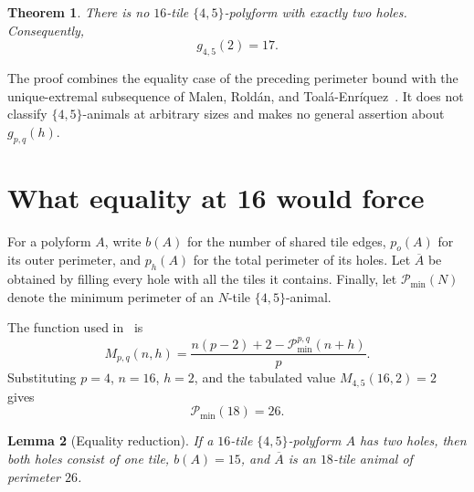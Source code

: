 \documentclass[11pt]{article}
\newtheorem{theorem}{Theorem}
\newtheorem{lemma}[theorem]{Lemma}
\begin{document}
\begin{theorem}\label{thm:main}
There is no $16$-tile $\{4,5\}$-polyform with exactly two holes.
Consequently,
\[
                         g_{4,5}(2)=17.
\]
\end{theorem}

The proof combines the equality case of the preceding perimeter bound with
the unique-extremal subsequence of Malen, Rold\'an, and
Toal\'a-Enr\'iquez~\cite{MalenRoldanToala2023}.  It does not classify
$\{4,5\}$-animals at arbitrary sizes and makes no general assertion about
$g_{p,q}(h)$.

\section{What equality at 16 would force}

For a polyform $A$, write $b(A)$ for the number of shared tile edges,
$p_o(A)$ for its outer perimeter, and $p_h(A)$ for the total perimeter of
its holes.  Let $\overline A$ be obtained by filling every hole with all the
tiles it contains.  Finally, let $\mathcal P_{\min}(N)$ denote the minimum perimeter of
an $N$-tile $\{4,5\}$-animal.

The function used in~\cite{EldridgeEtAl2026} is
\[
 M_{p,q}(n,h)
   =\frac{n(p-2)+2-\mathcal P_{\min}^{p,q}(n+h)}{p}.
\]
Substituting $p=4$, $n=16$, $h=2$, and the tabulated value
$M_{4,5}(16,2)=2$ gives
\begin{equation}\label{eq:pmin18}
                         \mathcal P_{\min}(18)=26.
\end{equation}

\begin{lemma}[Equality reduction]\label{lem:equality}
If a $16$-tile $\{4,5\}$-polyform $A$ has two holes, then both holes consist
of one tile, $b(A)=15$, and $\overline A$ is an $18$-tile animal of
perimeter $26$.
\end{lemma}
\end{document}
